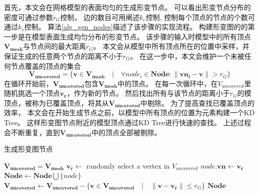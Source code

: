首先，本文会在网格模型的表面均匀的生成形变节点。
可以看出形变节点分布的密度可通过参数$r_G$控制，
边的数目可用阐述$k_e$控制,
控制每个顶点的节点的个数可通过$k_v$控制。
算法\ref{alg_gen_nodes}描述了该步骤的实现流程。
构建形变图的的第一步是在模型表面生成均匀分布的形变节点。
该步骤的输入时模型中的所有顶点$\bm{V_{mesh}}$与节点间的最大距离$r_G$。
本文会从模型中所有顶点所在的位置中采样，并保证生成的任意两个节点的距离不小于$r_G$。
在这一步中，本文会维护一个未被任何节点覆盖的顶点的集合
\begin{equation}
    \bm{V_{uncovered}}  = \{\bm{v} \in \bm{V_{mesh}} \quad |
    \quad \forall node_i \in \bm{Node}: \| \bm{vn_i} - \bm{v}\| > r_G\}
\end{equation}
在循环开始前，$\bm{V_{uncovered}}$包含$\bm{V_{mesh}}$中的顶点。
在每一次循环中，在$V_{uncovered}$里随机挑选一个顶点$\bm{v_r}$，作为新的节点。
然后找出所有与该节点的距离小于$r_G$的模顶点，被称为已覆盖顶点，将其从$\bm{V_{uncovered}}$中剔除。
为了提高查找已覆盖顶点的效率，
本文会在开始生成节点之前，以模型中所有顶点的位置为元素构建一个KD Tree。
这样形变图节点附近的模型顶点通过KD Tree进行快速的查找。
上述过程会不断重复，直到$\bm{V_{uncovered}}$中的顶点全部被剔除。
\begin{algorithm}
    \caption{生成形变图节点}
    \label{alg_gen_nodes}
    \begin{algorithmic}[1]
        \State $\bm{V_{uncovered}} = \bm{V_{mesh}}$
            \State $\bm{v_r} \gets$ randomly select a vertex in $V_{uncovered}$
            \State $node.\bm{vn} \gets \bm{v_r}$
            \State $\bm{Node} \gets \bm{Node} \bigcup \{node\}$
            \State $\bm{V_{uncovered}} \gets \bm{V_{uncovered}} - 
                    \{\bm{v} \in \bm{V_{uncovered}} \quad | \quad 
                    \|\bm{v} - \bm{v_r}\| \leq r_G\}$
        \EndWhile
        \State \Return $\bm{Node}$
    \EndFunction
    \end{algorithmic}
\end{algorithm} 

